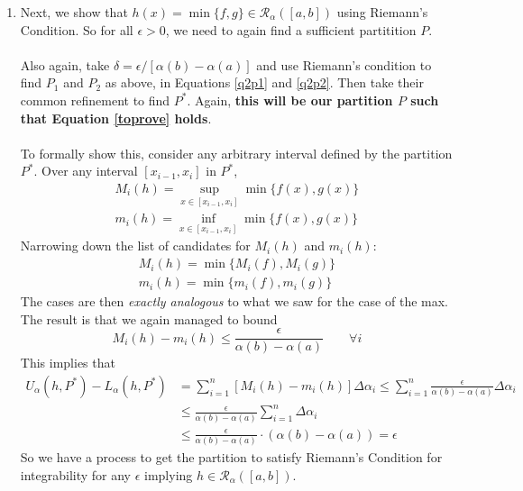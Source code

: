\documentclass[12pt]{article}
\theoremstyle{plain}
\theoremstyle{definition}
\theoremstyle{remark}
\begin{document}
\begin{enumerate}
\begin{enumerate}
        \newpage
        \item Next, we show that $h(x) = \min \{f, g\} \in
            \mathscr{R}_\alpha([a,b])$ using 
            Riemann's Condition. So for all $\epsilon>0$, we need
            to again find a sufficient partitition $P$.
            \\
            \\
            Also again, take $\delta = 
            \epsilon/[\alpha(b)-\alpha(a)]$ and use 
            Riemann's condition to find $P_1$ and $P_2$ 
            as above, in Equations \ref{q2p1} and \ref{q2p2}.
            Then take their common refinement to find $P^*$. 
            Again, 
            \textbf{this will be our partition $P$ such that 
            Equation \ref{toprove} holds}.
            \\
            \\
            To formally show this, consider any arbitrary 
            interval defined by the partition $P^*$. Over any 
            interval $[x_{i-1}, x_i]$ in $P^*$, 
            \begin{align*}
                M_i(h) = \sup_{x\in[x_{i-1}, x_i]} 
                    \min\{f(x), g(x)\} \\
                m_i(h) = \inf_{x\in[x_{i-1}, x_i]} 
                    \min\{f(x), g(x)\} 
            \end{align*}
            Narrowing down the list of 
            candidates for $M_i(h)$ and $m_i(h)$:
            \begin{align*}
                M_i(h) =  \min\{M_i(f), M_i(g)\} \\
                m_i(h) = \min\{m_i(f), m_i(g)\} 
            \end{align*}
            The cases are then \emph{exactly analogous}
            to what we saw for the case of the max.
            The result is that we again managed to bound
                \[ M_i(h) - m_i(h) 
                    \leq\frac{\epsilon}{\alpha(b)-\alpha(a)}
                    \qquad \forall i \]
            This implies that 
            \begin{align*}
                U_\alpha(h,P^*) - L_\alpha(h,P^*) &=
                \sum^n_{i=1} [M_i(h) - m_i(h)] \Delta\alpha_i 
                \leq \sum^n_{i=1} 
                    \frac{\epsilon}{\alpha(b)-\alpha(a)}
                    \Delta\alpha_i \\
                &\leq  \frac{\epsilon}{\alpha(b)-\alpha(a)}
                    \sum^n_{i=1} \Delta\alpha_i \\
                &\leq \frac{\epsilon}{\alpha(b)-\alpha(a)} \cdot
                    (\alpha(b) - \alpha(a)) 
                = \epsilon
            \end{align*}
            So we have a process to get the partition 
            to satisfy Riemann's Condition for integrability
            for any $\epsilon$ implying $h\in 
            \mathscr{R}_\alpha([a,b])$.
    \end{enumerate}


\end{enumerate}
\end{document}
